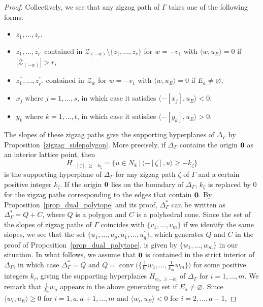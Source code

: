 \documentclass[11pt]{article}
\numberwithin{equation}{section}
\numberwithin{equation}{section}
\numberwithin{figure}{section}
\numberwithin{table}{section}
\newcommand{\RR}{\mathbb{R}}
\newcommand{\calZ}{\mathcal{Z}}
\begin{document}
\begin{proof}
Collectively, we see that any zigzag path of $\Gamma$ takes one of the following forms:
\begin{itemize}\itemsep=0pt
\item $z_1,\dots,z_r$,
\item $z_1^\prime,\dots,z_{r^\prime}^\prime$ contained in $\calZ_{(-w)}{\setminus}\{z_1,\dots,z_r\}$ for $w=-v_1$ with $\langle w,u_E\rangle=0$ if $|\calZ_{(-w)}|>r$,
\item $z_1^{\prime\prime},\dots,z_{r^{\prime\prime}}^{\prime\prime}$ contained in $\calZ_w$ for $w=-v_1$ with $\langle w,u_E\rangle=0$ if $E_a\neq\varnothing$,
\item $x_j$ where $j=1,\dots,s$, in which case it satisfies $\langle-[x_j],u_E\rangle<0$,
\item $y_k$ where $k=1,\dots,t$, in which case it satisfies $\langle-[y_k],u_E\rangle>0$.
\end{itemize}
The slopes of these zigzag paths give the supporting hyperplanes of $\Delta_\Gamma$ by Proposition~\ref{zigzag_sidepolygon}. More precisely, if $\Delta_\Gamma$ contains the origin ${\bf 0}$ as an interior lattice point, then
\begin{displaymath}
H_{-[\zeta],\ge -k_\zeta}=\{u\in N_\RR\,|\,\langle-[\zeta],u\rangle\ge -k_\zeta\}
\end{displaymath}
is the supporting hyperplane of $\Delta_\Gamma$ for any zigzag path $\zeta$ of $\Gamma$ and a certain positive integer $k_\zeta$.
If the origin ${\bf 0}$ lies on the boundary of $\Delta_\Gamma$, $k_\zeta$ is replaced by $0$ for the zigzag paths corresponding to the edges that contain ${\bf 0}$.
By Proposition~\ref{prop_dual_polytope} and its proof, $\Delta_\Gamma^*$ can be written as $\Delta_\Gamma^*=Q+C$, where $Q$ is a polygon and $C$ is a polyhedral cone.
Since the set of the slopes of zigzag paths of $\Gamma$ coincides with $\{v_1,\dots,v_m\}$ if we identify the same slopes,
we see that the set $\{u_1,\dots,u_p,u_1^\prime,\dots,u_q^\prime\}$, which generates $Q$ and $C$ in the proof of Proposition~\ref{prop_dual_polytope},
is given by $\{w_1,\dots,w_m\}$ in our situation.
In what follows, we assume that ${\bf 0}$ is contained in the strict interior of $\Delta_\Gamma$, in which case $\Delta_\Gamma^*=Q$ and
$Q=\operatorname{conv}\big(\big\{\frac{1}{k_1}w_1,\dots,\frac{1}{k_m}w_m\big\}\big)$ for some positive integers $k_i$,
giving the supporting hyperplanes $H_{w_i,\ge-k_i}$ of $\Delta_\Gamma$ for $i=1,\dots,m$.
We remark that $\frac{1}{k_a}w_a$ appears in the above generating set if $E_a\neq\varnothing$.
Since $\langle w_i,u_E\rangle\ge0$ for $i=1,a, a+1,\dots, m$ and $\langle w_i,u_E\rangle<0$ for $i=2,\dots, a-1$,

\end{proof}
\end{document}
